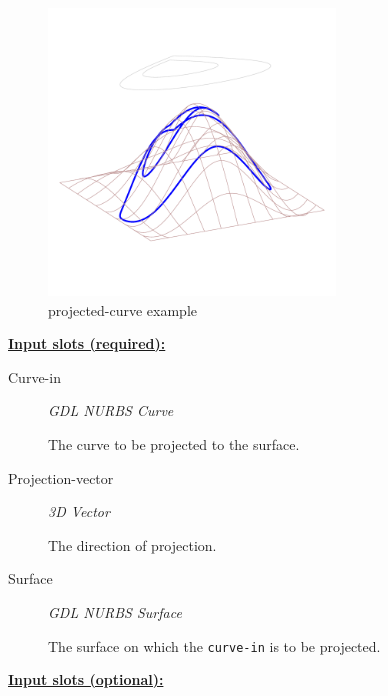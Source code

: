 \documentclass [11pt]{book}
\begin{document}
\begin{itemize}
\begin{figure}
\begin{center}
\includegraphics[width=3in,height=3in]{../images/example-projected-curve.pdf}
\end{center}

\caption{projected-curve example}

\label{fig:projected-curve}

\end{figure}





\textbf{
\underline{Input slots (required):}}

\begin{description}

\item [Curve-in]
\emph{GDL NURBS Curve}

 The curve to be projected to the surface.




\item [Projection-vector]
\emph{3D Vector}

 The direction of projection.




\item [Surface]
\emph{GDL NURBS Surface}

 The surface on which the \texttt{curve-in} is to be projected.




\end{description}






\textbf{
\underline{Input slots (optional):}}


\end{itemize}
\end{document}
